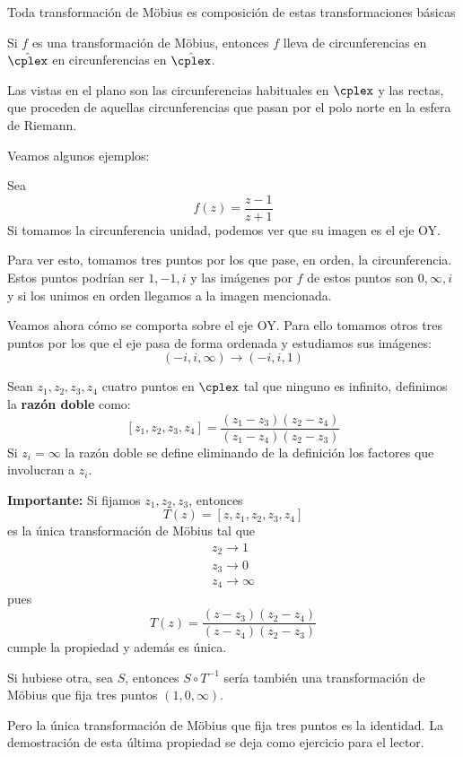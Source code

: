 \documentclass{apuntes}
\begin{document}
\obs Toda transformación de Möbius es composición de estas transformaciones básicas

\begin{theorem}
Si $f$ es una transformación de Möbius, entonces $f$ lleva de circunferencias en $\hat{\cplex}$ en circunferencias en $\hat{\cplex}$.
\end{theorem}
\obs Las  vistas en el plano son las circunferencias habituales en $\cplex$ y las rectas, que proceden de aquellas circunferencias que pasan por el polo norte en la esfera de Riemann.

Veamos algunos ejemplos:
\begin{example}
Sea
\[f(z)=\frac{z-1}{z+1}\]
Si tomamos la circunferencia unidad, podemos ver que su imagen es el eje OY.

Para ver esto, tomamos tres puntos por los que pase, en orden, la circunferencia. Estos puntos podrían ser $1,-1,i$ y las imágenes por $f$ de estos puntos son $0, \infty, i$ y si los unimos en orden llegamos a la imagen mencionada.

Veamos ahora cómo se comporta sobre el eje OY. Para ello tomamos otros tres puntos por los que el eje pasa de forma ordenada y estudiamos sus imágenes:
\[(-i,i,\infty) \to (-i,i,1)\]
\end{example}

\begin{defn}
Sean $z_1,z_2,z_3,z_4$ cuatro puntos en $\cplex$ tal que ninguno es infinito, definimos la \textbf{razón doble} como:
\[[z_1,z_2,z_3,z_4]=\frac{(z_1-z_3)(z_2-z_4)}{(z_1-z_4)(z_2-z_3)}\]
Si $z_i=\infty$ la razón doble se define eliminando de la definición los factores que involucran a $z_i$.
\end{defn}

\textbf{Importante:} Si fijamos $z_1,z_2,z_3$, entonces
\[T(z)=[z,z_1,z_2,z_3,z_4]\]
es la única transformación de Möbius tal que
\begin{align*}
z_2 \to 1\\ z_3 \to 0 \\ z_4 \to \infty
\end{align*}
pues
\[T(z)=\frac{(z-z_3)(z_2-z_4)}{(z-z_4)(z_2-z_3)}\]
cumple la propiedad y además es única.

Si hubiese otra, sea $S$, entonces $S\circ T^{-1}$ sería también una transformación de Möbius que fija tres puntos $(1,0,\infty)$.

Pero la única transformación de Möbius que fija tres puntos es la identidad. La demostración de esta última propiedad se deja como ejercicio para el lector.
\end{document}
